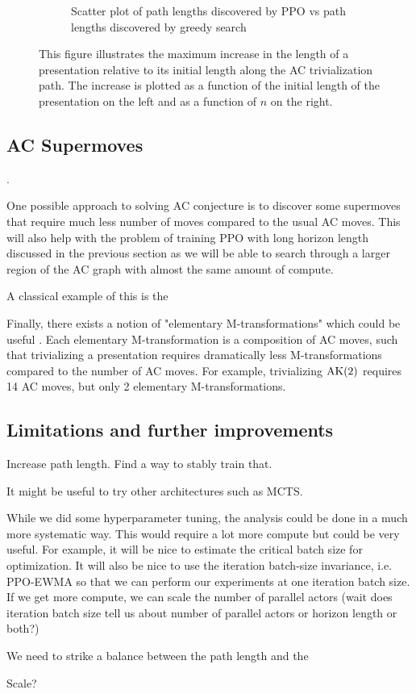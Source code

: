 \begin{figure}
\begin{subfigure}[b]{0.5\textwidth}
		\caption{Scatter plot of path lengths discovered by PPO vs path lengths discovered by greedy search}
		\label{fig:path_lengths_gs_vs_ppo}
	\end{subfigure}
	\caption{
This figure illustrates the maximum increase in the length of a presentation relative to its initial length along the AC trivialization path. The increase is plotted as a function of the initial length of the presentation on the left and as a function of $n$ on the right.} \label{fig:path_lengths_gs_vs_ppo_full}
\end{figure}

\subsection{AC Supermoves}.

One possible approach to solving AC conjecture is to discover some supermoves that require much less number of moves compared to the usual AC moves. This will also help with the problem of training PPO with long horizon length discussed in the previous section as we will be able to search through a larger region of the AC graph with almost the same amount of compute. 

A classical example of this is the 

Finally, there exists a notion of "elementary M-transformations" which could be useful \cite{BurnsI, BurnsII}.
Each elementary M-transformation is a composition of AC moves, such that trivializing a presentation requires dramatically less M-transformations compared to the number of AC moves.
For example, trivializing $\text{AK}(2)$ requires 14 AC moves, but only 2 elementary M-transformations.


\subsection{Limitations and further improvements}

Increase path length. Find a way to stably train that. 

It might be useful to try other architectures such as MCTS.

While we did some hyperparameter tuning, the analysis could be done in a much more systematic way. This would require a lot more compute but could be very useful. For example, it will be nice to estimate the critical batch size for optimization. It will also be nice to use the iteration batch-size invariance, i.e. PPO-EWMA so that we can perform our experiments at one iteration batch size. If we get more compute, we can scale the number of parallel actors (wait does iteration batch size tell us about number of parallel actors or horizon length or both?)

We need to strike a balance between the path length and the 

Scale?